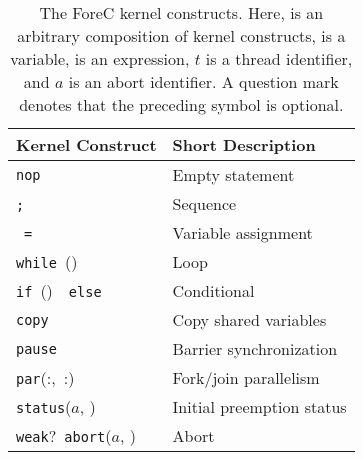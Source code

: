 \begin{table}[h]
	\centering
	\renewcommand{\arraystretch}{1.25}
	
	\begin{tabular}{l l}
		\bf{Kernel Construct}									& \bf{Short Description}	\\ 
		\hline
		\verb$nop$												& Empty statement			\\
		\body{}\verb$;$~\body{}									& Sequence					\\
		\var{}~\verb$=$~\expression{}							& Variable assignment		\\
		\verb$while$~(\expression{})~\body{}					& Loop						\\
		\verb$if$~(\expression{})~\body{}~\verb$else$~\body{}	& Conditional				\\
		\verb$copy$												& Copy shared variables		\\
		\verb$pause$											& Barrier synchronization	\\
		\verb$par$(\thread{}:\body{},~\thread{}:\body{})		& Fork/join parallelism		\\
		\verb$status$($a$, \expression{})						& Initial preemption status	\\
		\verb$weak$?~\verb$abort$($a$, \body{})					& Abort						\\
	\end{tabular}
	
	\caption{The ForeC kernel constructs. Here, \body{} is an arbitrary composition of kernel 
			 constructs, \var{} is a variable, \expression{} is an expression, $t$ is a thread 
			 identifier, and $a$ is an abort identifier. A question mark denotes that the 
			 preceding symbol is optional.}
	\label{table:forec_kernel}
\end{table}

